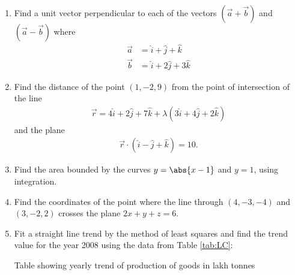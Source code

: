 \begin{enumerate}[label=\thesection.\arabic*.,ref=\thesection.\theenumi]
	\item Find a unit vector perpendicular to each of the vectors $(\vec{a}+\vec{b})$ and $(\vec{a}-\vec{b})$ where 
	\begin{align}
		\vec{a}&=\hat{i}+\hat{j}+\hat{k}\\\vec{b}&=\hat{i}+2\hat{j}+3\hat{k}
	\end{align}

\item Find the distance of the point $(1,-2,9)$ from the point of intersection of the line
		\begin{align}
			\vec{r}=4\hat{i}+2\hat{j}+7\hat{k}+\lambda(3\hat{i}+4\hat{j}+2\hat{k})
		\end{align}and the plane
		\begin{align}
			\vec{r}\cdot(\hat{i}-\hat{j}+\hat{k})=10.
		\end{align}

	\item Find the area bounded by the curves $y=\abs{x-1}$ and $y=1$, using integration.

	\item Find the coordinates of the point where the line through $(4,-3,-4)$ and $(3,-2,2)$ crosses the plane $2x+y+z=6$.

	\item Fit a straight line trend by the method of least squares and find the trend value for the year 2008 using the data from Table \ref{tab:LC}:
		\begin{table}[H]
			\caption{Table showing yearly trend of production of goods in lakh tonnes \label{tab:LC}}
			
		\end{table}
		\end{enumerate}
